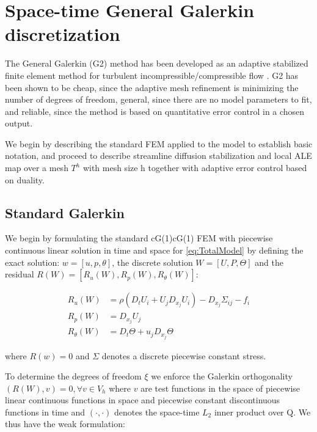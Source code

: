 
\section{Space-time General Galerkin discretization}

The General Galerkin (G2) method has been developed as an adaptive
stabilized finite element method for turbulent
incompressible/compressible flow
\cite{ho:siam:bb,hojo:cmame:special,ho:sp,ho:cc,ho:sp,ho:scm,ho:cnsg2}.
G2 has been shown to be cheap, since the adaptive mesh refinement is
minimizing the number of degrees of freedom, general, since there are
no model parameters to fit, and reliable, since the method is based on
quantitative error control in a chosen output.

We begin by describing the standard FEM applied to the model to
establish basic notation, and proceed to describe streamline diffusion
stabilization and local ALE map over a mesh $T^h$ with mesh size h
together with adaptive error control based on duality.

\subsection{Standard Galerkin}

We begin by formulating the standard cG(1)cG(1) FEM
\cite{ereshajo:cde} with piecewise continuous linear solution in time
and space for \ref{eq:TotalModel} by defining the exact solution: $w = [u,
  p, \theta]$, the discrete solution $W = [U, P, \Theta]$ and the
residual $R(W) = [R_u(W), R_p(W), R_\theta(W)]$:

\begin{align*}
  R_u(W) &= \rho(D_t U_i + U_j D_{x_j} U_i) - D_{x_j} \Sigma_{ij} - f_i\\
  R_p(W) &= D_{x_j} U_j\\
  R_\theta(W) &= D_t \Theta + u_j D_{x_j} \Theta
\end{align*}

where $R(w) = 0$ and $\Sigma$ denotes a discrete piecewise constant
stress.

To determine the degrees of freedom $\xi$ we enforce the Galerkin
orthogonality $(R(W), v) = 0, \forall v \in V_h$ where $v$ are test
functions in the space of piecewise linear continuous functions in
space and piecewise constant discontinuous functions in time and
$(\cdot,\cdot)$ denotes the space-time $L_2$ inner product over Q. We
thus have the weak formulation:

